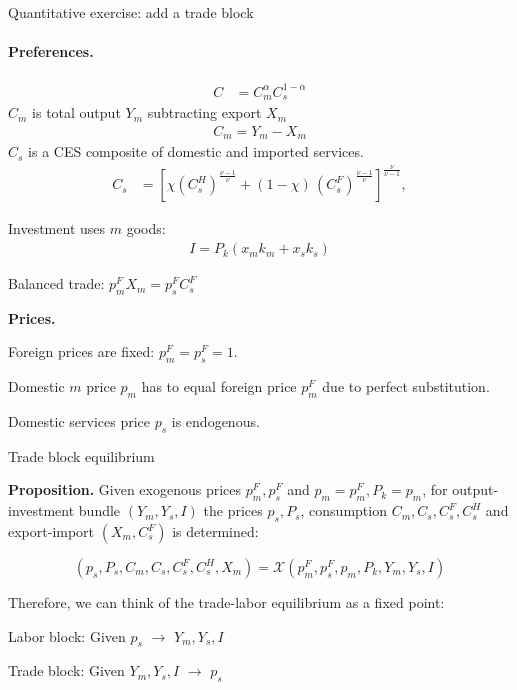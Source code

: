 \documentclass[9pt,xcolor={svgnames}]{beamer}
\begin{document}
\begin{frame}{Quantitative exercise: add a trade block}
\paragraph{Preferences.}
\begin{align*}
    C &= C_m^{\alpha}C_s^{1-\alpha}
\end{align*}
$C_m$ is total output $Y_m$ subtracting export $X_m$
\begin{align*}
     C_m  = Y_m - X_m 
\end{align*}
$C_s$ is a CES composite of domestic and imported services.     
   \begin{align*}
    C_s &= [\chi (C_s^{H})^{\frac{\nu-1}\nu} + (1-\chi)\,(C_s^{F})^{\frac{\nu-1}{\nu}}]^{\frac{\nu}{\nu-1}}, 
\end{align*}

Investment uses $m$ goods:  
\begin{align*}
    I = P_k(x_mk_m + x_sk_s) 
\end{align*}

Balanced trade:  $p_m^F X_m = p_s^F C_s^F $

\textbf{Prices.}

Foreign prices are fixed:  $p_m^F = p_s^F = 1$. 

Domestic $m$ price $p_m$ has to equal foreign price $p_m^F$ due to perfect substitution.

Domestic services price $p_s$ is endogenous. 
    
\end{frame}

\begin{frame}{Trade block equilibrium}



\textbf{Proposition.} Given exogenous prices $p^F_m, p_s^F $ and $p_m=p^F_m, P_k=p_m$, for output-investment bundle $(Y_m, Y_s, I)$ the prices $p_s, P_s$, consumption $C_m, C_s, C_s^F, C_s^H$ and export-import $(X_m, C^F_s)$  is determined:

\begin{equation*}
   (p_s, P_s, C_m, C_s, C_s^F, C_s^H, X_m) =  \mathcal{X}(p^F_m, p_s^F, p_m, P_k, Y_m, Y_s, I)
\end{equation*}


\vspace{3mm}


Therefore, we can think of the trade-labor equilibrium as a fixed point:  

Labor block:  Given $p_s$ $\rightarrow$ $Y_m, Y_s, I$


Trade block: Given $Y_m, Y_s, I$ $\rightarrow$ $p_s$


\end{frame}
\end{document}
